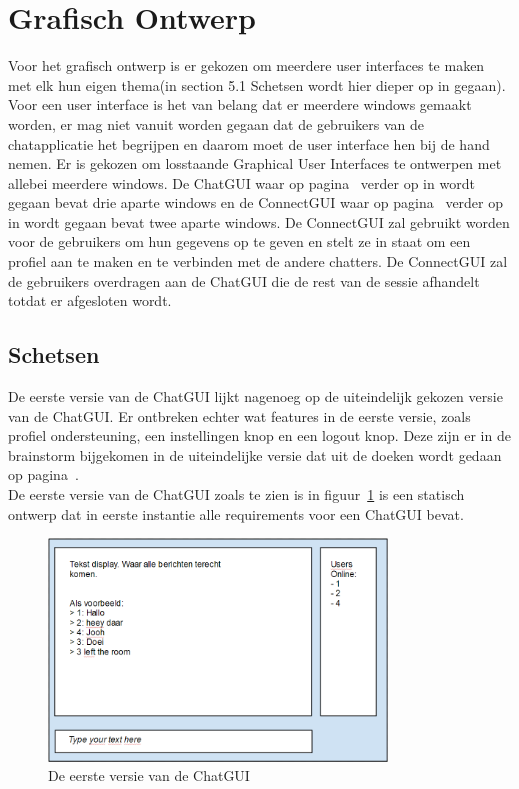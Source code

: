 \documentclass[12pt]{article}
\begin{document}
\section{Grafisch Ontwerp}
\label{aangegeven}
Voor het grafisch ontwerp is er gekozen om meerdere user interfaces te maken met elk hun eigen thema(in section 5.1 Schetsen wordt hier dieper op in gegaan). Voor een user interface is het van belang dat er meerdere windows gemaakt worden, er mag niet vanuit worden gegaan dat de gebruikers van de chatapplicatie het begrijpen en daarom moet de user interface hen bij de hand nemen.  Er is gekozen om losstaande Graphical User Interfaces te ontwerpen met allebei meerdere windows. De ChatGUI waar op pagina~\pageref{ChatGUI} verder op in wordt gegaan bevat drie aparte windows en de ConnectGUI waar op pagina~\pageref{ConnectGUI} verder op in wordt gegaan bevat twee aparte windows. De ConnectGUI zal gebruikt worden voor de gebruikers om hun gegevens op te geven en stelt ze in staat om een profiel aan te maken en te verbinden met de andere chatters. De ConnectGUI zal de gebruikers overdragen aan de ChatGUI die de rest van de sessie afhandelt totdat er afgesloten wordt.

\subsection{Schetsen}
De eerste versie van de ChatGUI lijkt nagenoeg op de uiteindelijk gekozen versie van de ChatGUI. Er ontbreken echter wat features in de eerste versie, zoals profiel ondersteuning, een instellingen knop en een  logout knop. Deze zijn er in de brainstorm bijgekomen in de uiteindelijke versie dat uit de doeken wordt gedaan op pagina~\pageref{Chat Window}. \\
De eerste versie van de ChatGUI zoals te zien is in figuur~\ref{figure001} is een statisch ontwerp dat in eerste instantie alle requirements voor een ChatGUI bevat.
\begin{figure}[ht]
\begin{center}
\includegraphics[width =90mm]{ChGDv1}
\caption{De eerste versie van de ChatGUI}
\label{figure001}
\end{center}
\end{figure}
\\
\end{document}
